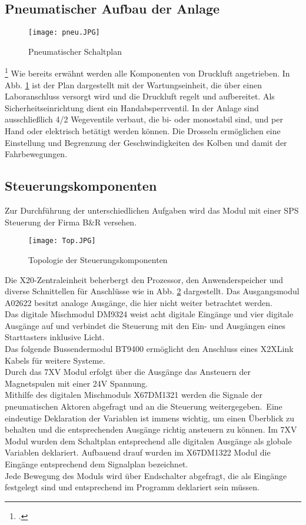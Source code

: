 \documentclass[12pt,a4paper]{scrartcl}	%
\begin{document}
\subsection{Pneumatischer Aufbau der Anlage}
\begin{figure}[h] 
	\centering
	\texttt{[image: pneu.JPG]}
	\caption[Pneumatischer Schaltplan]{Pneumatischer Schaltplan\footnotemark} 
	\label{pneu}
\end{figure}
\footcitetext[vgl.][S 8]{Labor}
Wie bereits erwähnt werden alle Komponenten von Druckluft angetrieben. In Abb. \ref{pneu} ist der Plan dargestellt mit der Wartungseinheit, die über einen Laboranschluss versorgt wird und die Druckluft regelt und aufbereitet. Als Sicherheitseinrichtung dient ein Handabsperrventil.
In der Anlage sind ausschließlich 4/2 Wegeventile verbaut, die bi- oder monostabil sind, und per Hand oder elektrisch betätigt werden können. Die Drosseln ermöglichen eine Einstellung und Begrenzung der Geschwindigkeiten des Kolben und damit der Fahrbewegungen.
\subsection{Steuerungskomponenten}
Zur Durchführung der unterschiedlichen Aufgaben wird das Modul mit einer SPS Steuerung der Firma B\&R versehen.
\begin{figure}[h] 
	\centering
	\texttt{[image: Top.JPG]}
	\caption[Topologie der Steuerungskomponenten]{Topologie der Steuerungskomponenten\footnotemark}
	\label{Top} 
\end{figure}
Die X20-Zentraleinheit beherbergt den Prozessor, den Anwenderspeicher und diverse Schnittellen für Anschlüsse wie in Abb. \ref{Top} dargestellt. Das Ausgangsmodul A02622 besitzt analoge Ausgänge, die hier nicht weiter betrachtet werden.\\
Das digitale Mischmodul DM9324 weist acht digitale Eingänge und vier digitale Ausgänge auf und verbindet die Steuerung mit den Ein- und Ausgängen eines Starttasters inklusive Licht.\\
Das folgende Bussendermodul BT9400 ermöglicht den Anschluss eines X2XLink Kabels für weitere Systeme.\\
Durch das 7XV Modul erfolgt über die Ausgänge das Ansteuern der Magnetspulen mit einer 24V Spannung.\\

Mithilfe des digitalen Mischmoduls X67DM1321 werden die Signale der pneumatischen Aktoren abgefragt und an die Steuerung weitergegeben.\
Eine eindeutige Deklaration der Variablen ist immens wichtig, um einen Überblick zu behalten und die entsprechenden Ausgänge richtig ansteuern zu können. Im 7XV Modul wurden dem Schaltplan entsprechend alle digitalen Ausgänge als globale Variablen deklariert.  Aufbauend drauf wurden im X67DM1322 Modul die Eingänge entsprechend dem Signalplan bezeichnet.\\
Jede Bewegung des Moduls wird über Endschalter abgefragt, die als Eingänge festgelegt sind und entsprechend im Programm deklariert sein müssen.
\end{document}
